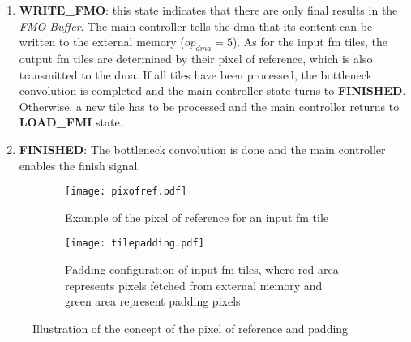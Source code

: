 \begin{enumerate}
    \item \textbf{WRITE\_FMO}: this state indicates that there are only final results in the \textit{FMO Buffer}. The main controller tells the \acrshort{dma} that its content can be written to the external memory ($op_{dma} = 5$). As for the input \acrshort{fm} tiles, the output \acrshort{fm} tiles are determined by their pixel of reference, which is also transmitted to the \acrshort{dma}. If all tiles have been processed, the bottleneck convolution is completed and the main controller state turns to \textbf{FINISHED}. Otherwise, a new tile has to be processed and the main controller returns to \textbf{LOAD\_FMI} state.
    \item \textbf{FINISHED}: The bottleneck convolution is done and the main controller enables the finish signal.
\end{enumerate}
%
\begin{figure}[H]
    \centering
    \begin{subfigure}[t]{.49\textwidth}
        \centering
        \texttt{[image: pixofref.pdf]}
        \caption{Example of the pixel of reference for an input \acrshort{fm} tile}
        \label{fig:pix_of_ref}
    \end{subfigure}
    \begin{subfigure}[t]{.49\textwidth}
        \centering
        \texttt{[image: tilepadding.pdf]}
        \caption{Padding configuration of input \acrshort{fm} tiles, where red area represents pixels fetched from external memory and green area represent padding pixels}
        \label{fig:tile_padding}
    \end{subfigure}
    \caption{Illustration of the concept of the pixel of reference and padding}
\end{figure}
%
